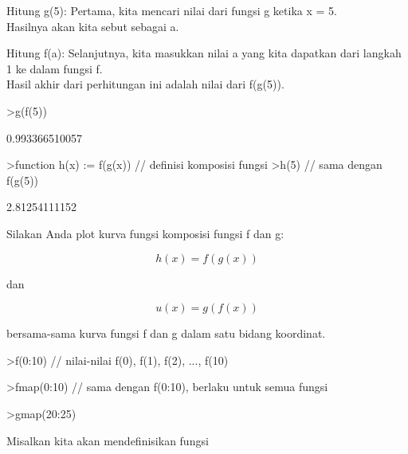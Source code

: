 \documentclass[a4paper,10pt]{article}
\begin{document}
\begin{eulernotebook}
\begin{eulercomment}
\begin{eulercomment}
\begin{eulercomment}
Hitung g(5): Pertama, kita mencari nilai dari fungsi g ketika x = 5.\\
Hasilnya akan kita sebut sebagai a.

Hitung f(a): Selanjutnya, kita masukkan nilai a yang kita dapatkan
dari langkah 1 ke dalam fungsi f.\\
Hasil akhir dari perhitungan ini adalah nilai dari f(g(5)).
\end{eulercomment}
\begin{eulerprompt}
>g(f(5))
\end{eulerprompt}
\begin{euleroutput}
  0.993366510057
\end{euleroutput}
\begin{eulerprompt}
>function h(x) := f(g(x)) // definisi komposisi fungsi 
>h(5) // sama dengan f(g(5))
\end{eulerprompt}
\begin{euleroutput}
  2.81254111152
\end{euleroutput}
\begin{eulercomment}
Silakan Anda plot kurva fungsi komposisi fungsi f dan g:

\end{eulercomment}
\begin{eulerformula}
\[
h(x)=f(g(x))
\]
\end{eulerformula}
\begin{eulercomment}
dan

\end{eulercomment}
\begin{eulerformula}
\[
u(x)=g(f(x))
\]
\end{eulerformula}
\begin{eulercomment}
bersama-sama kurva fungsi f dan g dalam satu bidang koordinat.
\end{eulercomment}
\begin{eulerprompt}
>f(0:10) // nilai-nilai f(0), f(1), f(2), ..., f(10)
\end{eulerprompt}
\begin{euleroutput}
  [2.71828,  4.71653,  24.6596,  81.3716,  192.52,  376.328,  650.612,
  1031.13,  1536.86,  2187.4,  3000.43]
\end{euleroutput}
\begin{eulerprompt}
>fmap(0:10) // sama dengan f(0:10), berlaku untuk semua fungsi
\end{eulerprompt}
\begin{euleroutput}
  [2.71828,  4.71653,  24.6596,  81.3716,  192.52,  376.328,  650.612,
  1031.13,  1536.86,  2187.4,  3000.43]
\end{euleroutput}
\begin{eulerprompt}
>gmap(20:25)
\end{eulerprompt}
\begin{euleroutput}
  [0.878052,  0.883737,  0.888915,  0.89365,  0.897998,  0.902003]
\end{euleroutput}
\begin{eulercomment}
Misalkan kita akan mendefinisikan fungsi


\end{eulercomment}
\end{eulercomment}
\end{eulercomment}
\end{eulernotebook}
\end{document}
